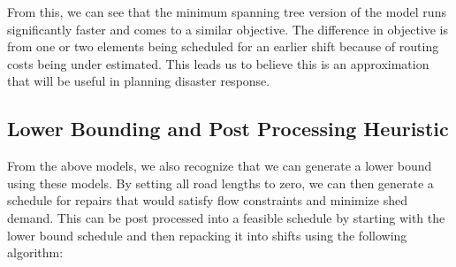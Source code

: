 \documentclass{article}
\begin{document}
From this, we can see that the minimum spanning tree version of the model runs significantly faster and comes to a similar objective. The difference in objective is from one or two elements being scheduled for an earlier shift because of routing costs being under estimated. This leads us to believe this is an approximation that will be useful in planning disaster response.

	\subsection{Lower Bounding and Post Processing Heuristic}
	
	From the above models, we also recognize that we can generate a lower bound using these models. By setting all road lengths to zero, we can then generate a schedule for repairs that would satisfy flow constraints and minimize shed demand. This can be post processed into a feasible schedule by starting with the lower bound schedule and then repacking it into shifts using the following algorithm:
\end{document}
